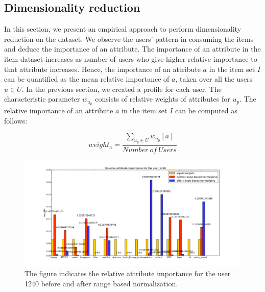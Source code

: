 \documentclass[11pt]{article}
\begin{document}
\subsection{Dimensionality reduction}
 In this section, we present an empirical approach to perform dimensionality reduction on the dataset. We observe the users' pattern in consuming the items and deduce the importance of an attribute. The importance of an attribute in the item dataset increases as number of users who give higher relative importance to that attribute increases. Hence, the importance of an attribute $a$ in the item set $I$ can be quantified as the mean relative importance of $a$, taken over all the users $u \in U$. In the previous section, we created a profile for each user. The characteristic parameter $w_{u_p}$ consists of relative weights of attributes for $u_p$. The relative importance of an attribute $a$ in the item set $I$ can be computed as follows:

\begin{equation}
weight_a = \frac{\sum_{u_p \in U} w_{u_p}[a]}{Number\ of\ Users} 
\end{equation}

\begin{figure}[htp]
\centering
\includegraphics[scale=0.3]{Images/user1240new.png}
\caption{The figure indicates the relative attribute importance for the user 1240 before and after range based normalization.}
\label{attribRelFreq_items}
\end{figure}

\newpage


\end{document}
